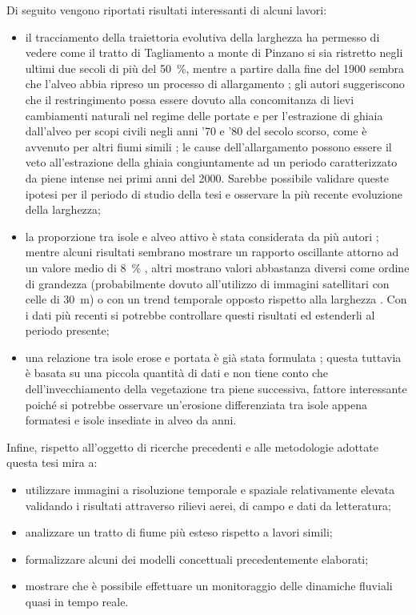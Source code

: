 Di seguito vengono riportati risultati interessanti di alcuni lavori: 
%
\begin{itemize}
	\item il tracciamento della traiettoria evolutiva della larghezza ha permesso di vedere come il tratto di Tagliamento a monte di Pinzano si sia ristretto negli ultimi due secoli di più del \SI{50}{\percent}, mentre a partire dalla fine del 1900 sembra che l'alveo abbia ripreso un processo di allargamento ;
	gli autori suggeriscono che il restringimento possa essere dovuto alla concomitanza di lievi cambiamenti naturali nel regime delle portate e per l'estrazione di ghiaia dall'alveo per scopi civili negli anni '70 e '80 del secolo scorso, come è avvenuto per altri fiumi simili ;
	le cause dell'allargamento possono essere il veto all'estrazione della ghiaia congiuntamente ad un periodo caratterizzato da piene intense nei primi anni del 2000.
	Sarebbe possibile validare queste ipotesi per il periodo di studio della tesi e osservare la più recente evoluzione della larghezza;
	\item la proporzione tra isole e alveo attivo è stata considerata da più autori ; 
	mentre alcuni risultati sembrano mostrare un rapporto oscillante attorno ad un valore medio di \SI{8}{\percent} , altri mostrano valori abbastanza diversi come ordine di grandezza  (probabilmente dovuto all'utilizzo di immagini satellitari con celle di \SI{30}{\m}) o con un trend temporale opposto rispetto alla larghezza .
	Con i dati più recenti si potrebbe controllare questi risultati ed estenderli al periodo presente;
	\item una relazione tra isole erose e portata è già stata formulata ;
	questa tuttavia è basata su una piccola quantità di dati e non tiene conto che dell'invecchiamento della vegetazione tra piene successiva, fattore interessante poiché si potrebbe osservare un'erosione differenziata tra isole appena formatesi e isole insediate in alveo da anni.
\end{itemize}

Infine, rispetto all'oggetto di ricerche precedenti e alle metodologie adottate questa tesi mira a:
%
\begin{itemize}
	\item utilizzare immagini a risoluzione temporale e spaziale relativamente elevata validando i risultati attraverso rilievi aerei, di campo e dati da letteratura;
	\item analizzare un tratto di fiume più esteso rispetto a lavori simili;
	\item formalizzare alcuni dei modelli concettuali precedentemente elaborati;	
	\item mostrare che è possibile effettuare un monitoraggio delle dinamiche fluviali quasi in tempo reale. 
\end{itemize}

